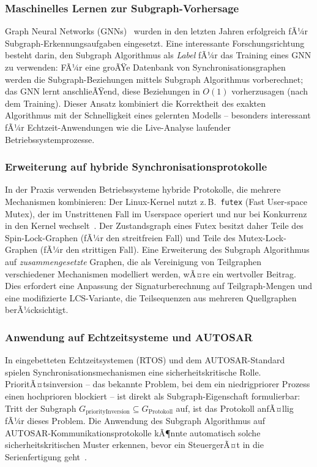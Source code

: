 ﻿\documentclass[a4paper,12pt]{article}
\theoremstyle{definition}
\begin{document}
\subsubsection{Maschinelles Lernen zur Subgraph-Vorhersage}

Graph Neural Networks (GNNs)~\cite{scarselli2009graph} wurden in den
letzten Jahren erfolgreich fÃ¼r Subgraph-Erkennungsaufgaben eingesetzt.
Eine interessante Forschungsrichtung besteht darin, den Subgraph Algorithmus
als \emph{Label} fÃ¼r das Training eines GNN zu verwenden: FÃ¼r eine groÃŸe
Datenbank von Synchronisationsgraphen werden die Subgraph-Beziehungen
mittels Subgraph Algorithmus vorberechnet; das GNN lernt anschlieÃŸend, diese
Beziehungen in $O(1)$ vorherzusagen (nach dem Training).
Dieser Ansatz kombiniert die Korrektheit des exakten Algorithmus mit der
Schnelligkeit eines gelernten Modells -- besonders interessant fÃ¼r
Echtzeit-Anwendungen wie die Live-Analyse laufender Betriebssystem\-prozesse.

\subsubsection{Erweiterung auf hybride Synchronisationsprotokolle}

In der Praxis verwenden Betriebssysteme hybride Protokolle, die mehrere
Mechanismen kombinieren: Der Linux-Kernel nutzt z.\,B.\ \texttt{futex}
(Fast User-space Mutex), der im Unstrittenen Fall im Userspace operiert
und nur bei Konkurrenz in den Kernel wechselt~\cite{franke2002fuss}.
Der Zustandsgraph eines Futex besitzt daher Teile des Spin-Lock-Graphen
(fÃ¼r den streitfreien Fall) und Teile des Mutex-Lock-Graphen (fÃ¼r den
strittigen Fall). Eine Erweiterung des Subgraph Algorithmus auf
\emph{zusammengesetzte} Graphen, die als Vereinigung von Teilgraphen
verschiedener Mechanismen modelliert werden, wÃ¤re ein wertvoller Beitrag.
Dies erfordert eine Anpassung der Signaturberechnung auf Teilgraph-Mengen
und eine modifizierte LCS-Variante, die Teilsequenzen aus mehreren
Quellgraphen berÃ¼cksichtigt.

\subsubsection{Anwendung auf Echtzeitsysteme und AUTOSAR}

In eingebetteten Echtzeitsystemen (RTOS) und dem AUTOSAR-Standard~\cite{autosar2021}
spielen Synchronisationsmechanismen eine sicherheitskritische Rolle.
PrioritÃ¤tsinversion -- das bekannte Problem, bei dem ein niedrigpriorer
Prozess einen hochprioren blockiert -- ist direkt als Subgraph-Eigenschaft
formulierbar: Tritt der Subgraph $G_{\mathrm{priorityInversion}} \subseteq
G_{\mathrm{Protokoll}}$ auf, ist das Protokoll anfÃ¤llig fÃ¼r dieses Problem.
Die Anwendung des Subgraph Algorithmus auf AUTOSAR-Kommunikations\-protokolle
kÃ¶nnte automatisch solche sicherheitskritischen Muster erkennen, bevor ein
SteuergerÃ¤t in die Serienfertigung geht~\cite{iso26262}.
\end{document}
